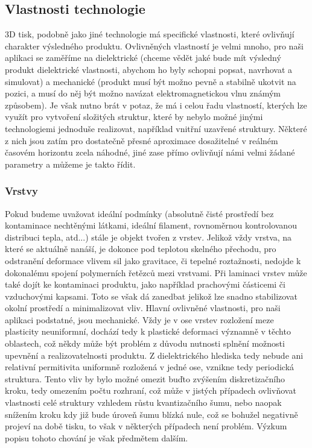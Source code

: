 \subsection{Vlastnosti technologie}
3D tisk, podobně jako jiné technologie má specifické vlastnosti, které ovlivňují charakter výsledného produktu. Ovlivněných vlastností je velmi mnoho, pro naši aplikaci se zaměříme na dielektrické (chceme vědět jaké bude mít výsledný produkt dielektrické vlastnosti, abychom ho byly schopni popsat, navrhovat a simulovat) a mechanické (produkt musí být možno pevně a stabilně ukotvit na pozici, a musí do něj být možno navázat elektromagnetickou vlnu známým způsobem). Je však nutno brát v potaz, že má i celou řadu vlastností, kterých lze využít pro vytvoření složitých struktur, které by nebylo možné jinými technologiemi jednoduše realizovat, například vnitřní uzavřené struktury. Některé z nich jsou zatím pro dostatečně přesné aproximace dosažitelné v reálném časovém horizontu zcela náhodné, jiné zase přímo ovlivňují námi velmi žádané parametry a můžeme je takto řídit.

\subsubsection{Vrstvy}
Pokud budeme uvažovat ideální podmínky (absolutně čisté prostředí bez kontaminace nechtěnými látkami, ideální filament, rovnoměrnou kontrolovanou distribuci tepla, atd...) stále je objekt tvořen z vrstev. Jelikož vždy vrstva, na které se aktuálně nanáší, je dokonce pod teplotou skelného přechodu, pro odstranění deformace vlivem sil jako gravitace, či tepelné roztažnosti, nedojde k dokonalému spojení polymerních řetězců mezi vrstvami. Při laminaci vrstev může také dojít ke kontaminaci produktu, jako například prachovými částicemi či vzduchovými kapsami. Toto se však dá zanedbat jelikož lze snadno stabilizovat okolní prostředí a minimalizovat vliv. 
Hlavní ovlivněné vlastnosti, pro naši aplikaci podstatné, jsou mechanické. Vždy je v ose vrstev rozložení meze plasticity neuniformní, dochází tedy k plastické deformaci významně v těchto oblastech, což někdy může být problém z důvodu nutnosti splnění možnosti upevnění a realizovatelnosti produktu.
Z dielektrického hlediska tedy nebude ani relativní permitivita uniformně rozložená v jedné ose, vznikne tedy periodická struktura. Tento vliv by bylo možné omezit buďto zvýšením diskretizačního kroku, tedy omezením počtu rozhraní, což může v jistých případech ovlivňovat vlastnosti celé struktury vzhledem růstu kvantizačního šumu, nebo naopak snížením kroku kdy již bude úroveň šumu blízká nule, což se bohužel negativně projeví na době tisku, to však v některých případech není problém. Výzkum popisu tohoto chování je však předmětem dalším.

